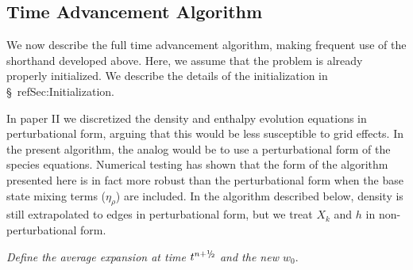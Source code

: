 \documentclass[11pt]{article}
\newcommand{\sfrac}[2]{\mathchoice
  {\kern0em\raise.5ex\hbox{\the\scriptfont0 #1}\kern-.15em/
   \kern-.15em\lower.25ex\hbox{\the\scriptfont0 #2}}
  {\kern0em\raise.5ex\hbox{\the\scriptfont0 #1}\kern-.15em/
   \kern-.15em\lower.25ex\hbox{\the\scriptfont0 #2}}
  {\kern0em\raise.5ex\hbox{\the\scriptscriptfont0 #1}\kern-.2em/
   \kern-.15em\lower.25ex\hbox{\the\scriptscriptfont0 #2}}
  {#1\!/#2}}
\newcommand{\myhalf}{\sfrac{1}{2}}
\newcommand{\nph}{{n + \myhalf}}
\newcommand{\etarho}{\eta_{\rho}}
\begin{document}
\subsection{Time Advancement Algorithm}

We now describe the full time advancement algorithm, making frequent
use of the shorthand developed above.  Here, we assume that the
problem is already properly initialized.  We describe the details of
the initialization in \S~ref{Sec:Initialization}.

In paper II we discretized the density and enthalpy evolution equations in 
perturbational form, arguing that this would be less
susceptible to grid effects.  In the present algorithm, the analog would
be to use a perturbational form of the species equations.
Numerical testing has shown that the form of the algorithm presented
here is in fact more robust than the perturbational form 
when the base state mixing terms ($\etarho$) are included.  
In the algorithm described below, density is still 
extrapolated to edges in perturbational form, but 
we treat $X_k$ and $h$ in non-perturbational form.

 {\em Define the average expansion at time $t^\nph$ and the new $w_0.$}
\end{document}
